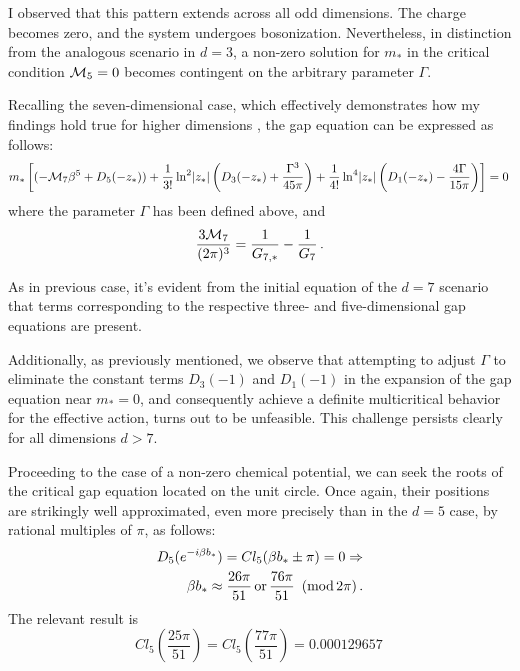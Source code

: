 \documentclass[twoside]{article}
\begin{document}
I observed that this pattern extends across all odd dimensions. The charge becomes zero, and the system undergoes bosonization. Nevertheless, in distinction from the analogous scenario in $d=3$, a non-zero solution for $m_*$ in the critical condition ${\cal M}_5=0$ becomes contingent on the arbitrary parameter $\Gamma$.

Recalling the seven-dimensional case, which effectively demonstrates how my findings hold true for higher dimensions \cite{Filothodoros:2018}, the gap equation can be expressed as follows:
\begin{align}
m_*\left[(-{\cal M}_7\beta^5+D_5(-z_*))+\frac{1}{3!}\ln^2\!|z_*|\left(D_3(-z_*)+\frac{\Gamma^3}{45\pi}\right)
+\frac{1}{4!}\ln^4\!|z_*|\left(D_1(-z_*)-\frac{4\Gamma}{15\pi}\right)\right]=0\,
\end{align}
where the parameter $\Gamma$ has been defined above, 
and 
\begin{equation}
\frac{3{\cal M}_7}{(2\pi)^3}=\frac{1}{G_{7,*}}-\frac{1}{G_7}\,.
\end{equation}

As in previous case, it's evident from the initial equation of the $d=7$ scenario that terms corresponding to the respective three- and five-dimensional gap equations are present.

Additionally, as previously mentioned, we observe that attempting to adjust $\Gamma$ to eliminate the constant terms $D_3(-1)$ and $D_1(-1)$ in the expansion of the gap equation near $m_*=0$, and consequently achieve a definite multicritical behavior for the effective action, turns out to be unfeasible. This challenge persists clearly for all dimensions $d>7$.

Proceeding to the case of a non-zero chemical potential, we can seek the roots of the critical gap equation located on the unit circle. Once again, their positions are strikingly well approximated, even more precisely than in the $d=5$ case, by rational multiples of $\pi$, as follows:
\begin{align}
\nonumber D_5(e^{-i\beta b_*})=Cl_5(\beta b_*\pm \pi)=0\Rightarrow \\
 \beta b_*\approx \frac{26\pi}{51}\,{\rm or}\,\frac{76\pi}{51} \,\,\,({\rm mod}\,2\pi)\,.
\end{align}
The relevant result is 
\begin{equation}
Cl_5\left(\frac{25\pi}{51}\right)=Cl_5\left(\frac{77\pi}{51}\right)=0.000129657\,
\end{equation}
\end{document}
